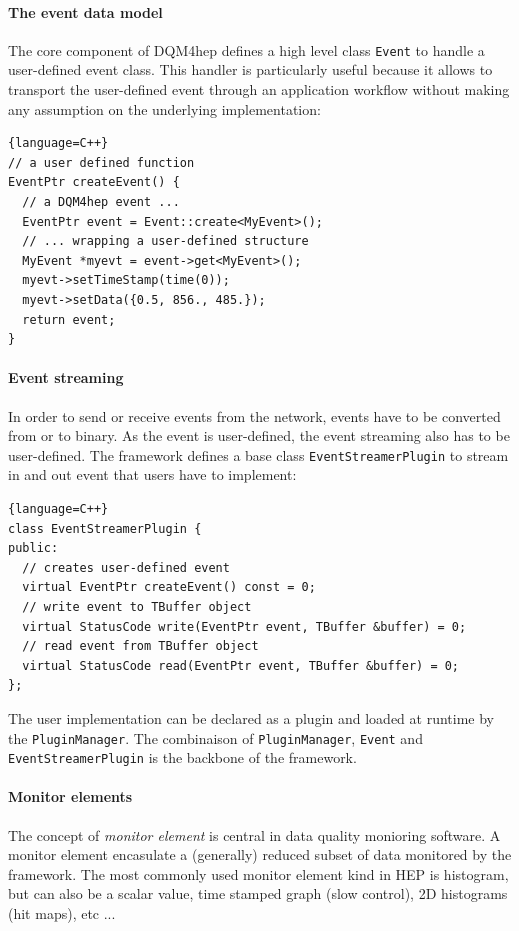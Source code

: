 \documentclass{webofc}
\begin{document}
\paragraph{The event data model}

The core component of DQM4hep defines a high level class \texttt{Event} to handle a user-defined event class. This handler is particularly useful because it allows to transport the user-defined event through an application workflow without making any assumption on the underlying implementation:

\begin{lstlisting}{language=C++}
// a user defined function
EventPtr createEvent() {
  // a DQM4hep event ...
  EventPtr event = Event::create<MyEvent>();
  // ... wrapping a user-defined structure
  MyEvent *myevt = event->get<MyEvent>();
  myevt->setTimeStamp(time(0));
  myevt->setData({0.5, 856., 485.});
  return event;
}
\end{lstlisting}

\paragraph{Event streaming}

In order to send or receive events from the network, events have to be converted from or to binary. As the event is user-defined, the event streaming also has to be user-defined. The framework defines a base class \texttt{EventStreamerPlugin} to stream in and out event that users have to implement:

\begin{lstlisting}{language=C++}
class EventStreamerPlugin {
public:
  // creates user-defined event
  virtual EventPtr createEvent() const = 0;
  // write event to TBuffer object
  virtual StatusCode write(EventPtr event, TBuffer &buffer) = 0;
  // read event from TBuffer object
  virtual StatusCode read(EventPtr event, TBuffer &buffer) = 0;
};
\end{lstlisting}

The user implementation can be declared as a plugin and loaded at runtime by the \texttt{PluginManager}. The combinaison of \texttt{PluginManager}, \texttt{Event} and \texttt{EventStreamerPlugin} is the backbone of the framework.

\paragraph{Monitor elements}

The concept of \textit{monitor element} is central in data quality monioring software. A monitor element encasulate a (generally) reduced subset of data monitored by the framework. The most commonly used monitor element kind in HEP is histogram, but can also be a scalar value, time stamped graph (slow control), 2D histograms (hit maps), etc ... 
\end{document}

